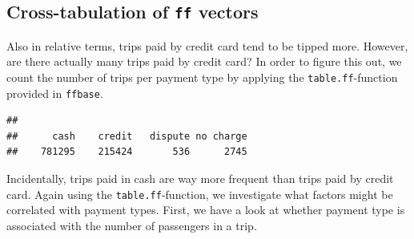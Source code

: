 \documentclass[
  12pt,
]{style/krantz}
\newenvironment{Shaded}{\begin{snugshade}}{\end{snugshade}}
\newcommand{\AttributeTok}[1]{\textcolor[rgb]{0.77,0.63,0.00}{#1}}
\newcommand{\CommentTok}[1]{\textcolor[rgb]{0.56,0.35,0.01}{\textit{#1}}}
\newcommand{\FunctionTok}[1]{\textcolor[rgb]{0.00,0.00,0.00}{#1}}
\newcommand{\NormalTok}[1]{#1}
\newcommand{\OtherTok}[1]{\textcolor[rgb]{0.56,0.35,0.01}{#1}}
\newcommand{\SpecialCharTok}[1]{\textcolor[rgb]{0.00,0.00,0.00}{#1}}
\newcommand{\StringTok}[1]{\textcolor[rgb]{0.31,0.60,0.02}{#1}}
\begin{document}
\hypertarget{cross-tabulation-of-ff-vectors}{%
\subsection{\texorpdfstring{Cross-tabulation of \texttt{ff} vectors}{Cross-tabulation of ff vectors}}\label{cross-tabulation-of-ff-vectors}}

Also in relative terms, trips paid by credit card tend to be tipped more. However, are there actually many trips paid by credit card? In order to figure this out, we count the number of trips per payment type by applying the \texttt{table.ff}-function provided in \texttt{ffbase}.

\begin{Shaded}
\end{Shaded}

\begin{verbatim}
## 
##      cash    credit   dispute no charge 
##    781295    215424       536      2745
\end{verbatim}

Incidentally, trips paid in cash are way more frequent than trips paid by credit card. Again using the \texttt{table.ff}-function, we investigate what factors might be correlated with payment types. First, we have a look at whether payment type is associated with the number of passengers in a trip.

\begin{Shaded}
\end{Shaded}
\end{document}
